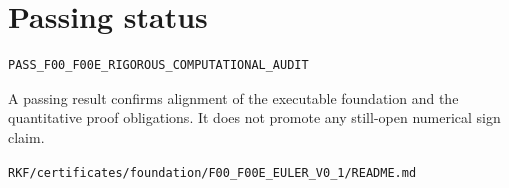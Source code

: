 \hypertarget{passing-status}{%
\section{Passing status}\label{passing-status}}

\begin{verbatim}
PASS_F00_F00E_RIGOROUS_COMPUTATIONAL_AUDIT
\end{verbatim}

A passing result confirms alignment of the executable foundation and the
quantitative proof obligations. It does not promote any still-open numerical
sign claim.

\begin{flushright}\small\texttt{RKF/certificates/foundation/F00\_F00E\_EULER\_V0\_1/README.md}\end{flushright}
